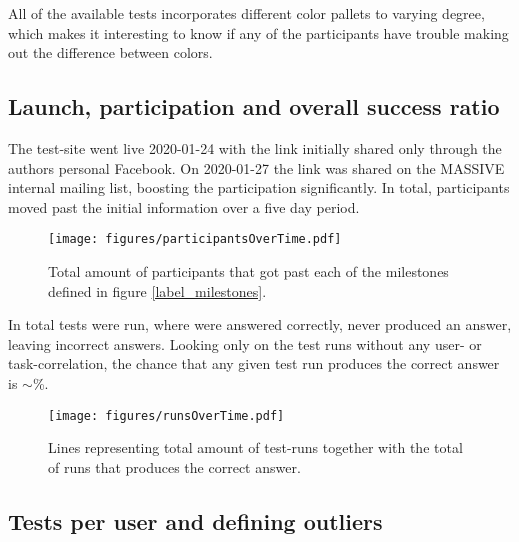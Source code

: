    All of the available tests incorporates different color pallets to
    varying degree, which makes it interesting to know if any of the
    participants have trouble making out the difference between colors.

	\newpage
  \subsection{Launch, participation and overall success ratio}

    The test-site went live 2020-01-24 with the link initially shared only
    through the authors personal Facebook. On 2020-01-27 the link was shared on
    the MASSIVE internal mailing list, boosting the participation
    significantly. In total,  participants moved
    past the initial information over a five day period.

    \begin{figure}[h!]
      \centering
      \texttt{[image: figures/participantsOverTime.pdf]}
      \caption{
        Total amount of participants that got past each of the milestones
        defined in figure \ref{label_milestones}.
      }
    \end{figure}

    In total  tests were run, where
     were answered correctly,
     never produced an answer, leaving
     incorrect answers. Looking only on the test
    runs without any user- or task-correlation, the chance that any given test run
    produces the correct answer is $\sim$\%.

    \begin{figure}[h!]
      \centering
      \texttt{[image: figures/runsOverTime.pdf]}
      \caption{Lines representing total amount of test-runs together with
        the total of runs that produces the correct answer.}
    \end{figure}

	\newpage
  \subsection{Tests per user and defining outliers}

